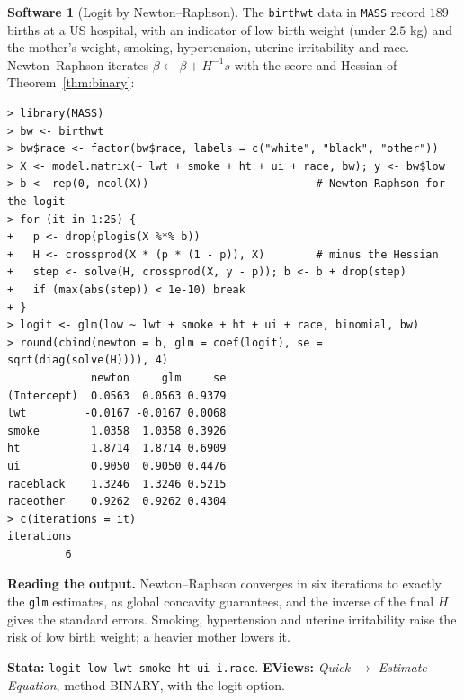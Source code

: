 \documentclass[11pt,a4paper]{article}
\numberwithin{equation}{section}
\theoremstyle{definition}
\newtheorem{software}[thm]{Software}
\begin{document}
\begin{software}[Logit by Newton--Raphson]
\label{sw:logit}
The \texttt{birthwt} data in \texttt{MASS} record $189$ births at a US hospital, with an indicator of low birth weight (under $2.5$ kg) and the mother's weight,
smoking, hypertension, uterine irritability and race. Newton--Raphson iterates $\beta \leftarrow \beta + H^{-1}s$ with the score and Hessian of Theorem~\ref{thm:binary}:
{\small\begin{verbatim}
> library(MASS)
> bw <- birthwt
> bw$race <- factor(bw$race, labels = c("white", "black", "other"))
> X <- model.matrix(~ lwt + smoke + ht + ui + race, bw); y <- bw$low
> b <- rep(0, ncol(X))                          # Newton-Raphson for the logit
> for (it in 1:25) {
+   p <- drop(plogis(X %*% b))
+   H <- crossprod(X * (p * (1 - p)), X)        # minus the Hessian
+   step <- solve(H, crossprod(X, y - p)); b <- b + drop(step)
+   if (max(abs(step)) < 1e-10) break
+ }
> logit <- glm(low ~ lwt + smoke + ht + ui + race, binomial, bw)
> round(cbind(newton = b, glm = coef(logit), se = sqrt(diag(solve(H)))), 4)
             newton     glm     se
(Intercept)  0.0563  0.0563 0.9379
lwt         -0.0167 -0.0167 0.0068
smoke        1.0358  1.0358 0.3926
ht           1.8714  1.8714 0.6909
ui           0.9050  0.9050 0.4476
raceblack    1.3246  1.3246 0.5215
raceother    0.9262  0.9262 0.4304
> c(iterations = it)
iterations 
         6 
\end{verbatim}}
\textbf{Reading the output.} Newton--Raphson converges in six iterations to exactly the \texttt{glm} estimates, as global concavity guarantees, and the inverse
of the final $H$ gives the standard errors. Smoking, hypertension and uterine irritability raise the risk of low birth weight; a heavier mother lowers
it.

\textbf{Stata:} \texttt{logit low lwt smoke ht ui i.race}. \textbf{EViews:} \emph{Quick $\to$ Estimate Equation}, method BINARY, with the logit option.
\end{software}
\end{document}
